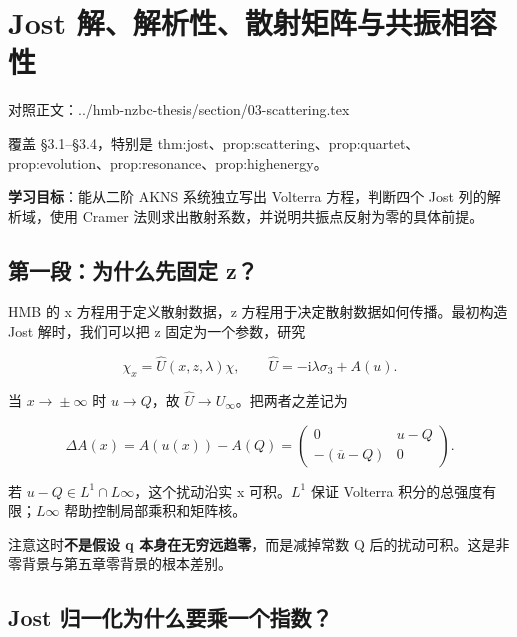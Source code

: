 
\chapter{Jost 解、解析性、散射矩阵与共振相容性}

对照正文：../hmb-nzbc-thesis/section/03-scattering.tex  \par
覆盖 §3.1–§3.4，特别是 thm:jost、prop:scattering、prop:quartet、prop:evolution、prop:resonance、prop:highenergy。\par

\textbf{学习目标}：能从二阶 AKNS 系统独立写出 Volterra 方程，判断四个 Jost 列的解析域，使用 Cramer 法则求出散射系数，并说明共振点反射为零的具体前提。\par

\section{第一段：为什么先固定 z？}

HMB 的 x 方程用于定义散射数据，z 方程用于决定散射数据如何传播。最初构造 Jost 解时，我们可以把 z 固定为一个参数，研究\par

\[
\chi_x=\widehat U(x,z,\lambda)\chi,
\qquad
\widehat U=-\mathrm{i}\lambda\sigma_3+A(u).
\]

当 $x\to{}\pm{}\infty{}$ 时 $u\to{}Q$，故 $\widehat U\to{}U_{\infty}$。把两者之差记为\par

\[
\Delta A(x)=A(u(x))-A(Q)
=\begin{pmatrix}0&u-Q\\-(\overline u-Q)&0\end{pmatrix}.
\]

若 $u-Q\in{}L^{1}\cap{}L\infty{}$，这个扰动沿实 x 可积。$L^{1}$ 保证 Volterra 积分的总强度有限；$L\infty{}$ 帮助控制局部乘积和矩阵核。\par

注意这时\textbf{不是假设 q 本身在无穷远趋零}，而是减掉常数 Q 后的扰动可积。这是非零背景与第五章零背景的根本差别。\par

\section{Jost 归一化为什么要乘一个指数？}


